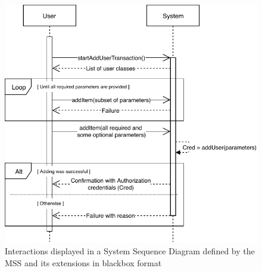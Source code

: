 \begin{figure}[H]
	\centering
	\includegraphics[scale=1]{SD-bb-createuser.pdf}
	\caption*{Interactions displayed in a System Sequence Diagram defined by the MSS and its extensions in blackbox format}
\end{figure}